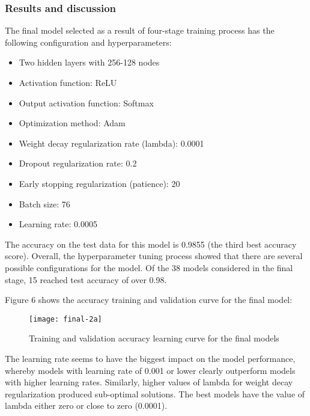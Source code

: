 \documentclass[]{article}
\providecommand{\tightlist}{%
  \setlength{\itemsep}{0pt}\setlength{\parskip}{0pt}}
\begin{document}
\hypertarget{results-and-discussion}{%
\subsubsection{Results and discussion}\label{results-and-discussion}}

The final model selected as a result of four-stage training process has
the following configuration and hyperparameters:

\begin{itemize}
\tightlist
\item
  Two hidden layers with 256-128 nodes
\item
  Activation function: ReLU
\item
  Output activation function: Softmax
\item
  Optimization method: Adam
\item
  Weight decay regularization rate (lambda): 0.0001
\item
  Dropout regularization rate: 0.2
\item
  Early stopping regularization (patience): 20
\item
  Batch size: 76
\item
  Learning rate: 0.0005
\end{itemize}

The accuracy on the test data for this model is 0.9855 (the third best
accuracy score). Overall, the hyperparameter tuning process showed that
there are several possible configurations for the model. Of the 38
models considered in the final stage, 15 reached test accuracy of over
0.98.

Figure 6 shows the accuracy training and validation curve for the final
model:

\begin{figure}

{\centering \texttt{[image: final-2a]} 

}

\caption{Training and validation accuracy learning curve for the final models}\label{fig:unnamed-chunk-10}
\end{figure}

The learning rate seems to have the biggest impact on the model
performance, whereby models with learning rate of 0.001 or lower clearly
outperform models with higher learning rates. Similarly, higher values
of lambda for weight decay regularization produced sub-optimal
solutions. The best models have the value of lambda either zero or close
to zero (0.0001).
\end{document}
